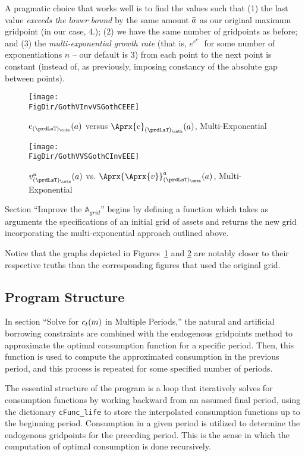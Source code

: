 A pragmatic choice that works well is to find the values such that (1) the last value \textit{exceeds the lower bound} by the same amount $\bar{a}$ as our original maximum gridpoint (in our case, 4.); (2) we have the same number of gridpoints as before; and (3) the \textit{multi-exponential growth rate} (that is, $e^{e^{e^{...}}}$ for some number of exponentiations $n$ -- our default is 3) from each point to the next point is constant (instead of, as previously, imposing constancy of the absolute gap between points).

\hypertarget{GothVInvVSGothCEEE}{}
\begin{figure}
  \centerline{\texttt{[image: \\FigDir/GothVInvVSGothCEEE]}}
  \caption{$\cFunc_{({\prdLsT})_\cntn}(\aNrm)$ versus
    $\Aprx{\cFunc}_{({\prdLsT})_\cntn}(\aNrm)$, Multi-Exponential }
  \label{fig:GothVInvVSGothCEE}
\end{figure}


\hypertarget{GothVVSGothCInvEEE}{}
\begin{figure}
  \texttt{[image: \\FigDir/GothVVSGothCInvEEE]}
  \caption{$\vFunc^{{a}}_{({\prdLsT})_\cntn}(\aNrm)$ vs.
    $\Aprx{\Aprx{\vFunc}}_{({\prdLsT})_\cntn}^{{a}}(\aNrm)$, Multi-Exponential }
  \label{fig:GothVVSGothCInvEE}
\end{figure}

Section ``Improve the $\mathbb{A}_{grid}$'' begins by defining a function which takes as arguments the specifications of an initial grid of assets and returns the new grid incorporating the multi-exponential approach outlined above.


Notice that the graphs depicted in Figures~\ref{fig:GothVInvVSGothCEE} and \ref{fig:GothVVSGothCInvEE} are notably closer to their respective truths than the corresponding figures that used the original grid.

\subsection{Program Structure}

In section ``Solve for $c_t(m)$ in Multiple Periods,'' the natural and artificial borrowing constraints are combined with the endogenous gridpoints method to approximate the optimal consumption function for a specific period. Then, this function is used to compute the approximated consumption in the previous period, and this process is repeated for some specified number of periods.

The essential structure of the program is a loop that iteratively solves for consumption functions by working backward from an assumed final period, using the dictionary \texttt{cFunc\_life} to store the interpolated consumption functions up to the beginning period. Consumption in a given period is utilized to determine the endogenous gridpoints for the preceding period. This is the sense in which the computation of optimal consumption is done recursively.

